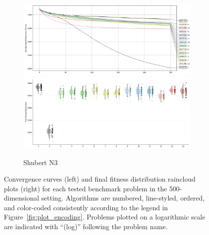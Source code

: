 \begin{figure}[p]
\begin{subfigure}{1\textwidth}
    \centering
    \includegraphics[width=.49\textwidth]{Figures/results/500/Shubert_N3_All_selected_algorithms_dim500_annot_legend.png}
    \includegraphics[width=.49\textwidth]{Figures/results/500/Shubert_N3_all_dim500_raincloud_vertical.png}
    \caption{Shubert N3}
\end{subfigure}

\captionsetup{list=no}
\caption[Convergence curves and final fitness distribution raincloud plots for 500-dimensional problems]{Convergence curves (left) and final fitness distribution raincloud plots (right) for each tested benchmark problem in the 500-dimensional setting. Algorithms are numbered, line-styled, ordered, and color-coded consistently according to the legend in Figure~\ref{fig:plot_encoding}. Problems plotted on a logarithmic scale are indicated with ``(log)'' following the problem name.}
\end{figure}





